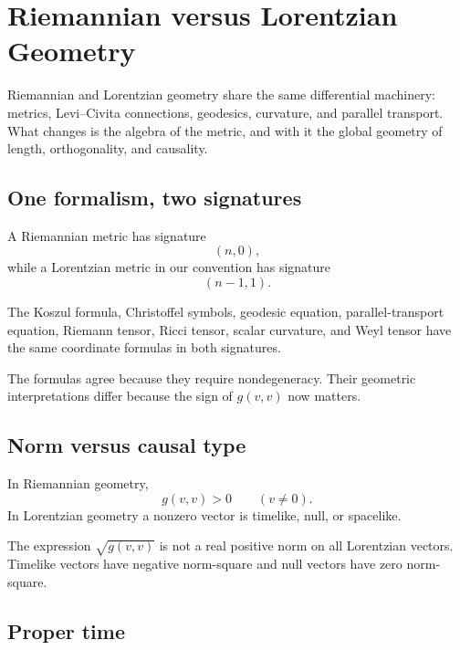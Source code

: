 \chapter{Riemannian versus Lorentzian Geometry}
\label{ch:vii30-riemannian-lorentzian}

Riemannian and Lorentzian geometry share the same differential machinery:
metrics, Levi--Civita connections, geodesics, curvature, and parallel transport.
What changes is the algebra of the metric, and with it the global geometry of
length, orthogonality, and causality.

\section{One formalism, two signatures}

A Riemannian metric has signature
\[
(n,0),
\]
while a Lorentzian metric in our convention has signature
\[
(n-1,1).
\]

\begin{proposition}\label{prop:vii30-shared}
The Koszul formula, Christoffel symbols, geodesic equation, parallel-transport
equation, Riemann tensor, Ricci tensor, scalar curvature, and Weyl tensor have the
same coordinate formulas in both signatures.
\end{proposition}

\begin{remark}
The formulas agree because they require nondegeneracy.  Their geometric
interpretations differ because the sign of \(g(v,v)\) now matters.
\end{remark}

\section{Norm versus causal type}

In Riemannian geometry,
\[
g(v,v)>0
\qquad(v\ne0).
\]
In Lorentzian geometry a nonzero vector is timelike, null, or spacelike.

\begin{warning}\label{warn:vii30-norm}
The expression \(\sqrt{g(v,v)}\) is not a real positive norm on all Lorentzian
vectors.  Timelike vectors have negative norm-square and null vectors have zero
norm-square.
\end{warning}

\section{Proper time}

